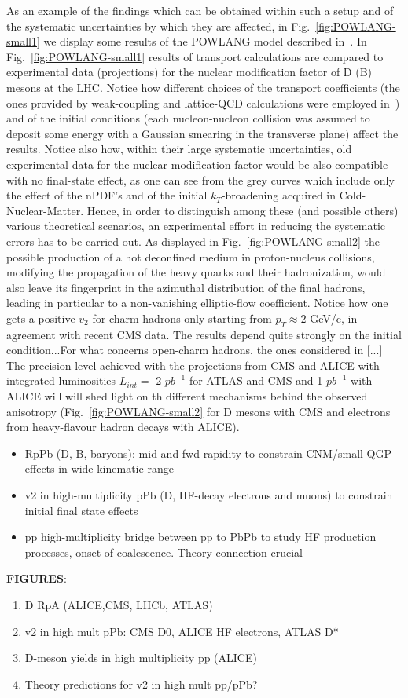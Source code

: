 As an example of the findings which can be obtained within such a setup and of the systematic uncertainties by which they are affected, in Fig.~\ref{fig:POWLANG-small1} we display some results of the POWLANG model described in~\cite{Beraudo:2015wsd}.
In Fig.~\ref{fig:POWLANG-small1} results of transport calculations are compared to experimental data (projections) for the nuclear modification factor of D (B) mesons at the LHC. Notice how different choices of the transport coefficients (the ones provided by weak-coupling and lattice-QCD calculations were employed in~\cite{Beraudo:2015wsd}) and of the initial conditions (each nucleon-nucleon collision was assumed to deposit some energy with a Gaussian smearing in the transverse plane) affect the results. Notice also how, within their large systematic uncertainties, old experimental data for the nuclear modification factor would be also compatible with no final-state effect, as one can see from the grey curves which include only the effect of the nPDF's and of the initial $k_T$-broadening acquired in Cold-Nuclear-Matter. Hence, in order to distinguish among these (and possible others) various theoretical scenarios, an experimental effort in reducing the systematic errors has to be carried out.
As displayed in Fig.~\ref{fig:POWLANG-small2} the possible production of a hot deconfined medium in proton-nucleus collisions, modifying the propagation of the heavy quarks and their hadronization, would also leave its fingerprint in the azimuthal distribution of the final hadrons, leading in particular to a non-vanishing elliptic-flow coefficient. Notice how one gets a positive $v_2$ for charm hadrons only starting from $p_T\!\approx\!2$ GeV/c, in agreement with recent CMS data. The results depend quite strongly on the initial condition...For what concerns open-charm hadrons, the ones considered in [...]
The precision level achieved with the projections from CMS and ALICE with integrated luminosities $L_{int}=$ 2 $pb^{-1}$ for ATLAS and CMS and 1 $pb^{-1}$ with ALICE will will shed light on th different mechanisms behind the observed anisotropy (Fig.~\ref{fig:POWLANG-small2} for D mesons with CMS and electrons from heavy-flavour hadron decays with ALICE).


\begin{itemize}
\item{RpPb} (D, B, baryons): mid and fwd rapidity to constrain CNM/small QGP effects in wide kinematic range
\item{v2}  in high-multiplicity pPb (D, HF-decay electrons and muons) to constrain initial final state effects
\item{pp high-multiplicity} bridge between pp to PbPb to study HF production processes, onset of coalescence.
Theory connection crucial
\end{itemize}

\textbf{FIGURES}:
\begin{enumerate}
\item D RpA (ALICE,CMS, LHCb, ATLAS)
\item v2 in high mult pPb: CMS D0,  ALICE HF electrons, ATLAS D*
\item D-meson yields in high multiplicity pp (ALICE)
\item Theory predictions for v2 in high mult pp/pPb?
\end{enumerate}

